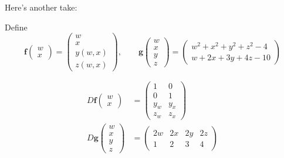 \documentclass[answers]{exam}
\newcommand{\vf}{\mathbf{f}}
\newcommand{\vg}{\mathbf{g}}
\begin{document}
\begin{questions}
    Here's another take:
    \begin{solution}
        Define
        \[
            \vf\begin{pmatrix}
                w\\x
            \end{pmatrix} = \begin{pmatrix}
                w\\x\\y(w,x)\\z(w,x)
            \end{pmatrix},\qquad
            \vg\begin{pmatrix}w\\x\\y\\z\end{pmatrix} = \begin{pmatrix}
                w^2 + x^2 + y^2 + z^2 - 4\\
                w + 2x + 3y + 4z - 10
            \end{pmatrix}
        \]

        \begin{align*}
            D\vf\begin{pmatrix}
                w\\x
            \end{pmatrix}&= \begin{pmatrix}
                1&0\\0&1\\y_w&y_x\\z_w&z_x
            \end{pmatrix}\\
            D\vg\begin{pmatrix}
                w\\x\\y\\z
            \end{pmatrix}&= \begin{pmatrix}
                2w & 2x & 2y & 2z\\
                1&2&3&4
            \end{pmatrix}
        \end{align*}


\end{solution}
\end{questions}
\end{document}
